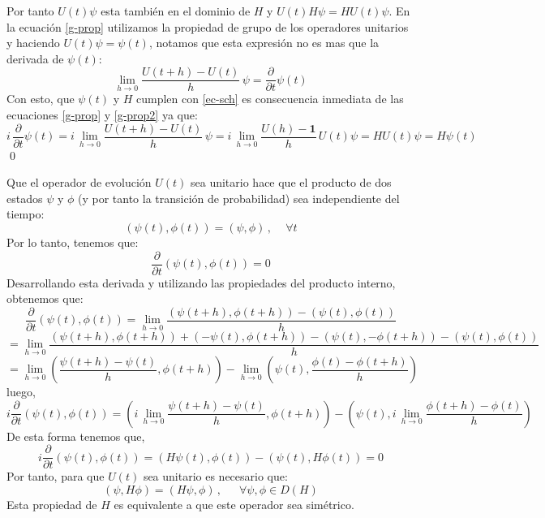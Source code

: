 \documentclass[12pt]{book}
\numberwithin{equation}{chapter}
\def\rar{\rightarrow}
\def\1{\mathbf{1}}
\begin{document}
Por tanto $U(t) \psi$ esta tambi\'en en el dominio de $H$ y $ U(t)H \psi = HU(t) \psi $. En la ecuaci\'on \eqref{g-prop} utilizamos la propiedad de grupo de los operadores unitarios y haciendo $U(t) \psi = \psi (t)$, notamos que esta expresi\'on no es mas que la derivada de $\psi(t)$:
\begin{equation}
\lim_{h \rar 0} \frac{ U(t+h) - U(t) }{h} \, \psi = \frac{\partial}{\partial t}\psi(t)
\end{equation}
Con esto, que $\psi(t)$ y $H$ cumplen con \eqref{ec-sch} es consecuencia inmediata de las ecuaciones \eqref{g-prop} y \eqref{g-prop2} ya que:
\begin{equation}
i\,\frac{\partial}{\partial t}\psi(t)=i\,\lim_{h \rar 0} \frac{ U(t+h) - U(t) }{h} \, \psi
=i\, \lim_{h \rar 0} \frac{U(h) - \1}{h}\, U(t)\psi= H U(t)\psi = H\psi (t)
\end{equation}
\qed
\vspace{5 mm}

Que el operador de evoluci\'on $U(t)$ sea unitario hace que el producto de dos estados $\psi$ y $\phi$ (y por tanto la transici\'on de probabilidad) sea independiente del tiempo:
\begin{equation}
( \psi (t) , \phi (t) ) = ( \psi , \phi )\,,\,\,\,\,\,\,\, \forall t
\end{equation}
Por lo tanto, tenemos que:
\begin{equation}
\frac{\partial}{\partial t} ( \psi (t) , \phi (t) ) =0 
\end{equation}
Desarrollando esta derivada y utilizando las propiedades del producto interno, obtenemos que:
$$ \frac{\partial}{\partial t} ( \psi (t) , \phi (t) ) = \lim_{h \rar 0} \frac{ ( \psi(t+h),\phi(t+h) ) - ( \psi (t) , \phi(t) ) }{h}  $$
$$ = \lim_{h \rar 0} \frac{ ( \psi(t+h),\phi(t+h) )+(-\psi(t),\phi(t+h))-(\psi(t),-\phi(t+h) ) - ( \psi (t) , \phi(t) ) }{h} $$
$$= \lim_{h \rar 0} \left(\frac{\psi(t+h)-\psi(t)}{h}, \phi(t+h) \right) - \lim_{h \rar 0} \left( \psi(t), \frac{ \phi(t) - \phi(t+h) }{h} \right) $$
luego,
$$ i \frac{\partial}{\partial t} ( \psi (t) , \phi (t) ) =  \left( i\, \lim_{h \rar 0} \frac{\psi(t+h)-\psi(t)}{h}, \phi(t+h) \right) - \left(\psi(t),i\, \lim_{h \rar 0} \frac{\phi(t+h) - \phi(t) }{h} \right) $$
De esta forma tenemos que,
$$ i \frac{\partial}{\partial t} ( \psi (t) , \phi (t) ) = (H \psi(t) ,\phi(t) ) - ( \psi(t),H \phi(t)  ) =0 $$
Por tanto, para que $U(t)$ sea unitario es necesario que:
\begin{equation}
( \psi , H\phi )= ( H \psi , \phi ) \,,\,\,\,\,\,\,\,\,\, \forall \psi , \phi \in D(H)
\end{equation} 
Esta propiedad de $H$ es equivalente a que este operador sea sim\'etrico.
\end{document}
